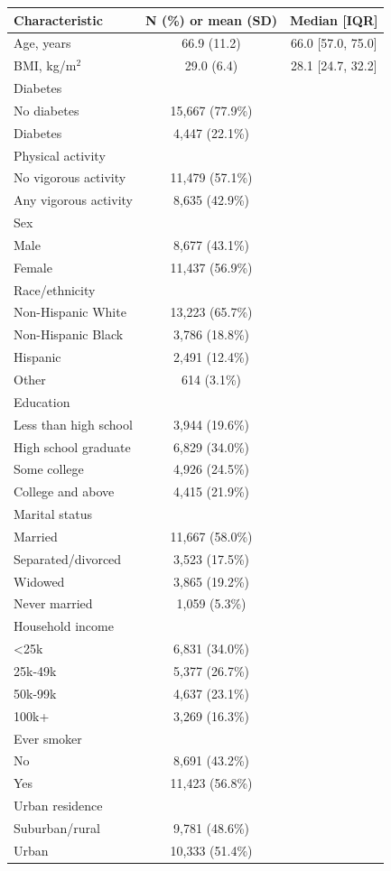 \begin{tabular}{lcc}
\toprule
Characteristic & N (\%) or mean (SD) & Median [IQR] \\
\midrule
Age, years & 66.9 (11.2) & 66.0 [57.0, 75.0] \\
BMI, kg/m$^2$ & 29.0 (6.4) & 28.1 [24.7, 32.2] \\
Diabetes &  &  \\
\quad No diabetes & 15,667 (77.9\%) &  \\
\quad Diabetes & 4,447 (22.1\%) &  \\
Physical activity &  &  \\
\quad No vigorous activity & 11,479 (57.1\%) &  \\
\quad Any vigorous activity & 8,635 (42.9\%) &  \\
Sex &  &  \\
\quad Male & 8,677 (43.1\%) &  \\
\quad Female & 11,437 (56.9\%) &  \\
Race/ethnicity &  &  \\
\quad Non-Hispanic White & 13,223 (65.7\%) &  \\
\quad Non-Hispanic Black & 3,786 (18.8\%) &  \\
\quad Hispanic & 2,491 (12.4\%) &  \\
\quad Other & 614 (3.1\%) &  \\
Education &  &  \\
\quad Less than high school & 3,944 (19.6\%) &  \\
\quad High school graduate & 6,829 (34.0\%) &  \\
\quad Some college & 4,926 (24.5\%) &  \\
\quad College and above & 4,415 (21.9\%) &  \\
Marital status &  &  \\
\quad Married & 11,667 (58.0\%) &  \\
\quad Separated/divorced & 3,523 (17.5\%) &  \\
\quad Widowed & 3,865 (19.2\%) &  \\
\quad Never married & 1,059 (5.3\%) &  \\
Household income &  &  \\
\quad <25k & 6,831 (34.0\%) &  \\
\quad 25k-49k & 5,377 (26.7\%) &  \\
\quad 50k-99k & 4,637 (23.1\%) &  \\
\quad 100k+ & 3,269 (16.3\%) &  \\
Ever smoker &  &  \\
\quad No & 8,691 (43.2\%) &  \\
\quad Yes & 11,423 (56.8\%) &  \\
Urban residence &  &  \\
\quad Suburban/rural & 9,781 (48.6\%) &  \\
\quad Urban & 10,333 (51.4\%) &  \\
\bottomrule
\end{tabular}